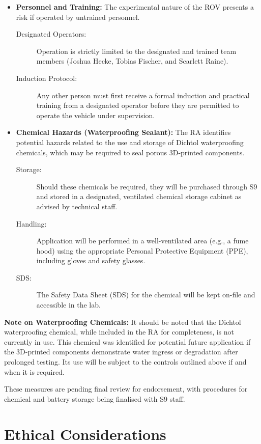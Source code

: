 \documentclass[11pt, a4paper]{article}
\begin{document}
\begin{itemize}
    \item \textbf{Personnel and Training:}
    The experimental nature of the ROV presents a risk if operated by untrained personnel.
    \begin{description}
        \item[Designated Operators:] Operation is strictly limited to the designated and trained team members (Joshua Hecke, Tobias Fischer, and Scarlett Raine).
        \item[Induction Protocol:] Any other person must first receive a formal induction and practical training from a designated operator before they are permitted to operate the vehicle under supervision.
    \end{description}

    \item \textbf{Chemical Hazards (Waterproofing Sealant):}
    The RA identifies potential hazards related to the use and storage of Dichtol waterproofing chemicals, which may be required to seal porous 3D-printed components.
    \begin{description}
        \item[Storage:] Should these chemicals be required, they will be purchased through S9 and stored in a designated, ventilated chemical storage cabinet as advised by technical staff.
        \item[Handling:] Application will be performed in a well-ventilated area (e.g., a fume hood) using the appropriate Personal Protective Equipment (PPE), including gloves and safety glasses.
        \item[SDS:] The Safety Data Sheet (SDS) for the chemical will be kept on-file and accessible in the lab.
    \end{description}
\end{itemize}

\par\noindent\textbf{Note on Waterproofing Chemicals:} It should be noted that the Dichtol waterproofing chemical, while included in the RA for completeness, is not currently in use. This chemical was identified for potential future application if the 3D-printed components demonstrate water ingress or degradation after prolonged testing. Its use will be subject to the controls outlined above if and when it is required.

These measures are pending final review for endorsement, with procedures for chemical and battery storage being finalised with S9 staff.
\section{Ethical Considerations}
\label{subsec:ethics}
\end{document}
